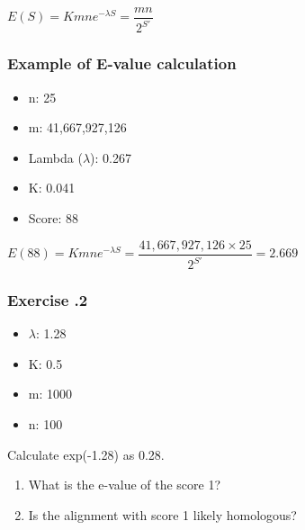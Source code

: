 $E(S) = Kmne^{-λS} = \dfrac{mn}{2^{S'}}$\\

%
%
\subsubsection*{Example of E-value calculation} 
\begin{itemize}
\item n: 25
\item m: 41,667,927,126
\item Lambda ($\lambda$): 0.267
\item K: 0.041
\item Score: 88
\end{itemize}

$E(88) = Kmne^{-\lambda S} = \dfrac{41,667,927,126 \times 25}{2^{S'}} = 2.669$\\

%
%
\subsubsection*{Exercise \thesection.2}

\begin{itemize}
\item $\lambda$: 1.28
\item K: 0.5
\item m: 1000
\item n: 100
\end{itemize}

Calculate exp(-1.28) as 0.28.

\begin{enumerate}
\item What is the e-value of the score 1? 
\bigskip 
\item Is the alignment with score 1 likely homologous?
\end{enumerate}

\bigskip 

%
